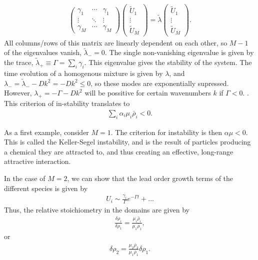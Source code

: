 \begin{align}
    \begin{pmatrix}
        \gamma_1 & \cdots & \gamma_1 \\
        \vdots & \ddots & \vdots \\
        \gamma_M & \cdots & \gamma_M
    \end{pmatrix}
    \begin{pmatrix}
        \tilde U_1 \\ \vdots\\ \tilde U_M
    \end{pmatrix}
    = 
    \tilde \lambda 
    \begin{pmatrix}
        \tilde U_1 \\ \vdots \\\tilde U_M
    \end{pmatrix}.
\end{align}
%
All columns/rows of this matrix are linearly dependent on each other, so $M - 1$ of the eigenvalues vanish, $\tilde \lambda_- = 0 $.
The single non-vanishing eigenvalue is given by the trace, $\tilde \lambda_+ \equiv \Gamma = \sum_i \gamma_i$.
This eigenvalue gives the stability of the system.
The time evolution of a homogenous mixture is given by $\lambda$, and $\lambda_- = \tilde \lambda_- - D k^2 =  - Dk^2 \leq 0$, so these modes are exponentially supressed.
However, $\lambda_+ = -\Gamma - D k^2$ will be possitive for certain wavenumbers $k$ if $\Gamma< 0$.
.
This criterion of in-stability translates to 
%
\begin{align}
    \sum_i \alpha_i \mu_i \bar \rho _i  < 0.
\end{align}
%


As a first example, consider $M=1$.
The criterion for instability is then $\alpha \mu < 0$.
This is called the Keller-Segel instability, and is the result of particles producing a chemical they are attracted to, and thus creating an effective, long-range attractive interaction.

In the case of $M = 2$, we can show that the lead order growth terms of the different species is given by
%
\begin{align}
    U_i \sim \frac{\gamma_i}{\Gamma} e^{-\Gamma t} + \dots
\end{align}
%
Thus, the relative stoichiometry in the domains are given by
%
\begin{align}
    \frac{\delta \rho_i}{\delta \rho_1} = \frac{\mu_i \bar \rho_i}{\mu_1 \bar \rho_1},
\end{align}
%
or
%
\begin{align}
    \delta \rho_2 = \frac{\mu_2 \bar \rho_2}{\mu_1 \bar \rho_1} \delta \rho_1.
\end{align}
%
